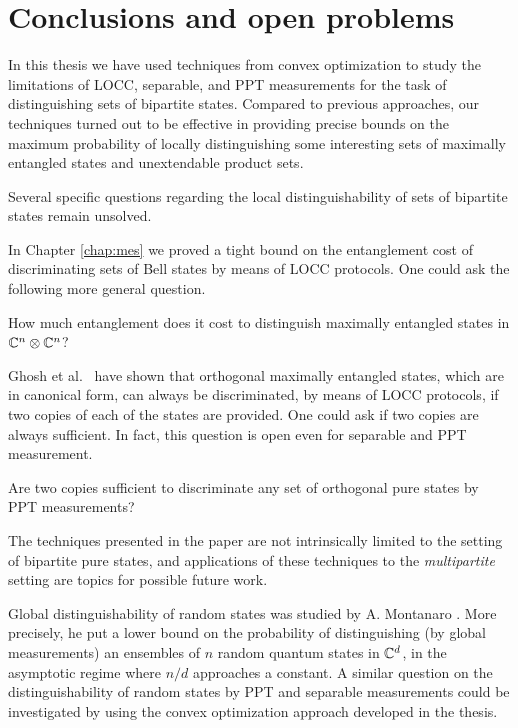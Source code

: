 \chapter{Conclusions and open problems}
\label{chap:conclusions}

In this thesis we have used techniques from convex optimization to study 
the limitations of LOCC, separable, and PPT measurements for the task of 
distinguishing sets of bipartite states. Compared to previous approaches,
our techniques turned out to be effective in providing precise bounds on 
the maximum probability of locally distinguishing some interesting sets 
of maximally entangled states and unextendable product sets.

Several specific questions regarding the local distinguishability of sets of 
bipartite states remain unsolved.

In Chapter \ref{chap:mes} we proved a tight bound on the entanglement
cost of discriminating sets of Bell states by means of LOCC protocols. 
One could ask the following more general question.
\begin{question}
How much entanglement does it cost to distinguish 
maximally entangled states in $\mathbb{C}^{n}\otimes\mathbb{C}^{n}$?
\end{question}

Ghosh et al.~\cite{Ghosh04} have shown that orthogonal maximally
entangled states, which are in canonical form, can always be discriminated,
by means of LOCC protocols, if two copies of each of the states are provided.
One could ask if two copies are always sufficient. In fact, this question is open
even for separable and PPT measurement.
\begin{question}
Are two copies sufficient to discriminate any set of orthogonal pure states 
by PPT measurements?
\end{question}

The techniques presented in the paper are not intrinsically limited 
to the setting of bipartite pure states, and applications of these techniques to
the \emph{multipartite} setting are topics for possible future work.

Global distinguishability of random states was studied by A. Montanaro \cite{Montanaro07}.
More precisely, he put a lower bound on the probability of distinguishing 
(by global measurements) an ensembles of $n$ random quantum states in $\mathbb{C}^{d}$,
in the asymptotic regime where $n/d$ approaches a constant. A similar question 
on the distinguishability of random states by PPT and separable measurements 
could be investigated by using the convex optimization approach developed in the thesis.

